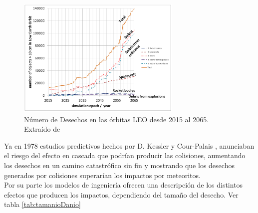 \begin{figure}[!h]
  \centering
  \includegraphics[width=0.7\textwidth]{imagenes/debriscollision}
  \caption[N\'umero de Desechos en las \'orbitas LEO desde 2015 al 2065]{N\'umero de Desechos en las \'orbitas LEO desde 2015 al 2065. Extra\'ido de \citep{karacalioglu2016impact}}
  \label{fig:debriscollision}
\end{figure}

Ya en 1978  estudios predictivos hechos por D. Kessler y Cour-Palais
 \cite{kessler0}, anunciaban el riesgo del efecto en cascada que podr\'ian producir las colisiones, aumentando los desechos en un camino catastr\'ofico sin fin y mostrando que los desechos generados por colisiones superar\'ian los impactos por meteoritos.\\
 
 Por su parte los modelos de ingenier\'ia ofrecen una descripci\'on de los distintos efectos que producen los impactos, dependiendo del tama\~no del desecho. Ver tabla \ref{tab:tamanioDanio}\\
 
